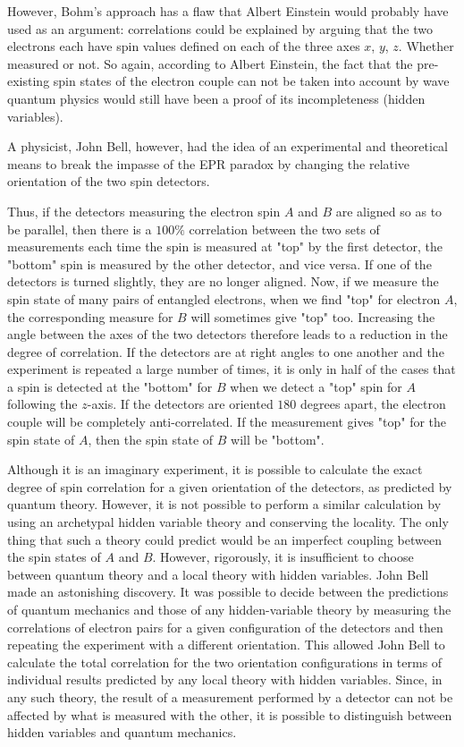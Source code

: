 	However, Bohm's approach has a flaw that Albert Einstein would probably have used as an argument: correlations could be explained by arguing that the two electrons each have spin values defined on each of the three axes $x$, $y$, $z$. Whether measured or not. So again, according to Albert Einstein, the fact that the pre-existing spin states of the electron couple can not be taken into account by wave quantum physics would still have been a proof of its incompleteness (hidden variables).
	
	A physicist, John Bell, however, had the idea of an experimental and theoretical means to break the impasse of the EPR paradox by changing the relative orientation of the two spin detectors.

	Thus, if the detectors measuring the electron spin $A$ and $B$ are aligned so as to be parallel, then there is a $100\%$ correlation between the two sets of measurements each time the spin is measured at "top" by the first detector, the "bottom" spin is measured by the other detector, and vice versa. If one of the detectors is turned slightly, they are no longer aligned. Now, if we measure the spin state of many pairs of entangled electrons, when we find "top" for electron $A$, the corresponding measure for $B$ will sometimes give "top" too. Increasing the angle between the axes of the two detectors therefore leads to a reduction in the degree of correlation. If the detectors are at right angles to one another and the experiment is repeated a large number of times, it is only in half of the cases that a spin is detected at the "bottom" for $B$ when we detect a "top" spin for $A$ following the $z$-axis. If the detectors are oriented $180$ degrees apart, the electron couple will be completely anti-correlated. If the measurement gives "top" for the spin state of $A$, then the spin state of $B$ will be "bottom".
	
	Although it is an imaginary experiment, it is possible to calculate the exact degree of spin correlation for a given orientation of the detectors, as predicted by quantum theory. However, it is not possible to perform a similar calculation by using an archetypal hidden variable theory and conserving the locality. The only thing that such a theory could predict would be an imperfect coupling between the spin states of $A$ and $B$. However, rigorously, it is insufficient to choose between quantum theory and a local theory with hidden variables. John Bell made an astonishing discovery. It was possible to decide between the predictions of quantum mechanics and those of any hidden-variable theory by measuring the correlations of electron pairs for a given configuration of the detectors and then repeating the experiment with a different orientation. This allowed John Bell to calculate the total correlation for the two orientation configurations in terms of individual results predicted by any local theory with hidden variables. Since, in any such theory, the result of a measurement performed by a detector can not be affected by what is measured with the other, it is possible to distinguish between hidden variables and quantum mechanics.
	
